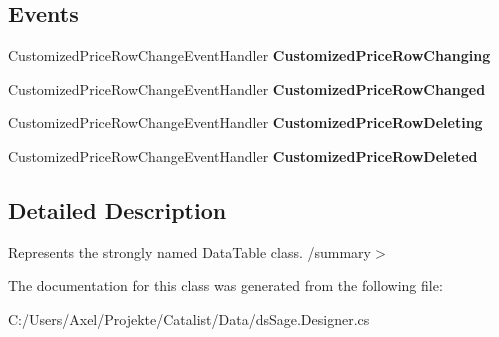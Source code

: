 \subsection*{Events}
\begin{DoxyCompactItemize}
\item 
Customized\+Price\+Row\+Change\+Event\+Handler {\bfseries Customized\+Price\+Row\+Changing}\hypertarget{class_products_1_1_data_1_1ds_sage_1_1_customized_price_data_table_a1efd21f7f5cd4b2f22a8bef6a8784db4}{}\label{class_products_1_1_data_1_1ds_sage_1_1_customized_price_data_table_a1efd21f7f5cd4b2f22a8bef6a8784db4}

\item 
Customized\+Price\+Row\+Change\+Event\+Handler {\bfseries Customized\+Price\+Row\+Changed}\hypertarget{class_products_1_1_data_1_1ds_sage_1_1_customized_price_data_table_adbe644f3aa9109330e87f853215f149e}{}\label{class_products_1_1_data_1_1ds_sage_1_1_customized_price_data_table_adbe644f3aa9109330e87f853215f149e}

\item 
Customized\+Price\+Row\+Change\+Event\+Handler {\bfseries Customized\+Price\+Row\+Deleting}\hypertarget{class_products_1_1_data_1_1ds_sage_1_1_customized_price_data_table_ac7edb109226b02e35ab4b5d74d346893}{}\label{class_products_1_1_data_1_1ds_sage_1_1_customized_price_data_table_ac7edb109226b02e35ab4b5d74d346893}

\item 
Customized\+Price\+Row\+Change\+Event\+Handler {\bfseries Customized\+Price\+Row\+Deleted}\hypertarget{class_products_1_1_data_1_1ds_sage_1_1_customized_price_data_table_a042b244d914bf62c2d2aa3c6467da6ff}{}\label{class_products_1_1_data_1_1ds_sage_1_1_customized_price_data_table_a042b244d914bf62c2d2aa3c6467da6ff}

\end{DoxyCompactItemize}


\subsection{Detailed Description}
Represents the strongly named Data\+Table class. /summary$>$ 

The documentation for this class was generated from the following file\+:\begin{DoxyCompactItemize}
\item 
C\+:/\+Users/\+Axel/\+Projekte/\+Catalist/\+Data/ds\+Sage.\+Designer.\+cs\end{DoxyCompactItemize}

